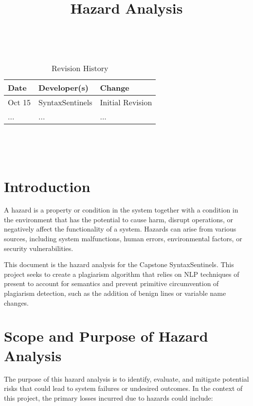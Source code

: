 \documentclass{article}
\title{Hazard Analysis\\\progname}
\author{\authname}
\date{}
\begin{document}
\maketitle
\thispagestyle{empty}

~\newpage


\begin{table}[hp]
\caption{Revision History} \label{TblRevisionHistory}
\begin{tabularx}{\textwidth}{llX}
\toprule
\textbf{Date} & \textbf{Developer(s)} & \textbf{Change}\\
\midrule
Oct 15 & SyntaxSentinels & Initial Revision\\
... & ... & ...\\
\bottomrule
\end{tabularx}
\end{table}

~\newpage

\tableofcontents

~\newpage



\section{Introduction}

A hazard is a property or condition in the system together with a condition in the environment that has the potential to cause harm, disrupt operations, 
or negatively affect the functionality of a system. Hazards can arise from various sources, including system 
malfunctions, human errors, environmental factors, or security vulnerabilities.

This document is the hazard analysis for the Capstone SyntaxSentinels. This project seeks to create a plagiarism algorithm that relies on NLP
techniques of present to account for semantics and prevent primitive circumvention of plagiarism detection, such as the addition of benign lines or
variable name changes.

\section{Scope and Purpose of Hazard Analysis}

The purpose of this hazard analysis is to identify, evaluate, and mitigate potential risks that could lead to system failures or undesired outcomes. In the context of this project, the primary losses incurred due to hazards could include:
\end{document}
